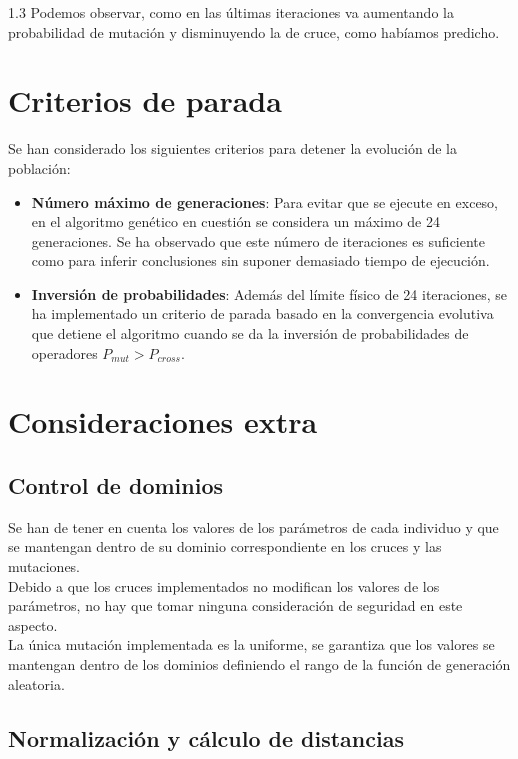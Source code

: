 \documentclass{article}
\begin{document}
\begin{spacing}{1.3}
Podemos observar, como en las últimas iteraciones va aumentando la probabilidad de mutación
y disminuyendo la de cruce, como habíamos predicho.
\newpage
\section{Criterios de parada}

Se han considerado los siguientes criterios para detener la evolución de la población:

\begin{itemize}
  \item \textbf{Número máximo de generaciones}: Para evitar que se ejecute en exceso, en el algoritmo genético en cuestión se considera un máximo de 24 generaciones. Se ha observado que este número de iteraciones es suficiente como para inferir conclusiones sin suponer demasiado tiempo de ejecución.
  \item \textbf{Inversión de probabilidades}: Además del límite físico de 24 iteraciones, se ha implementado un criterio de parada basado en la convergencia evolutiva que detiene el algoritmo cuando se da la inversión de probabilidades de operadores $P_{mut} > P_{cross} $.
\end{itemize}

\section{Consideraciones extra}

\subsection{Control de dominios}
Se han de tener en cuenta los valores de los parámetros de cada individuo y que se mantengan dentro de su dominio correspondiente en los cruces y las mutaciones.\\

Debido a que los cruces implementados no modifican los valores de los parámetros, no hay que tomar ninguna consideración de seguridad en este aspecto. \\

La única mutación implementada es la uniforme, se garantiza que los valores se mantengan dentro de los dominios definiendo el rango de la función de generación aleatoria.\\

\subsection{Normalización y cálculo de distancias}\label{sec:Normalizacion}


\end{spacing}
\end{document}
